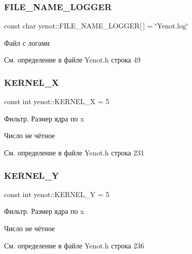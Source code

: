 \subsubsection{\texorpdfstring{F\+I\+L\+E\+\_\+\+N\+A\+M\+E\+\_\+\+L\+O\+G\+G\+ER}{FILE\_NAME\_LOGGER}}
{\footnotesize\ttfamily const char yenot\+::\+F\+I\+L\+E\+\_\+\+N\+A\+M\+E\+\_\+\+L\+O\+G\+G\+ER\mbox{[}$\,$\mbox{]} = \char`\"{}Yenot.\+log\char`\"{}}



Файл с логами 



См. определение в файле Yenot.\+h строка 49

\mbox{\label{namespaceyenot_aa753d0e3e99fb4b37b3930996bdfe563}} 
\subsubsection{\texorpdfstring{K\+E\+R\+N\+E\+L\+\_\+X}{KERNEL\_X}}
{\footnotesize\ttfamily const int yenot\+::\+K\+E\+R\+N\+E\+L\+\_\+X = 5}

Фильтр. Размер ядра по x

Число не чётное 

См. определение в файле Yenot.\+h строка 231

\mbox{\label{namespaceyenot_a33a5af73a30e2b5684ee02cc4bf4c374}} 
\subsubsection{\texorpdfstring{K\+E\+R\+N\+E\+L\+\_\+Y}{KERNEL\_Y}}
{\footnotesize\ttfamily const int yenot\+::\+K\+E\+R\+N\+E\+L\+\_\+Y = 5}

Фильтр. Размер ядра по x

Число не чётное 

См. определение в файле Yenot.\+h строка 236

\mbox{\label{namespaceyenot_a08c0d88b074bcba3b7d79d019211a1ac}} 

